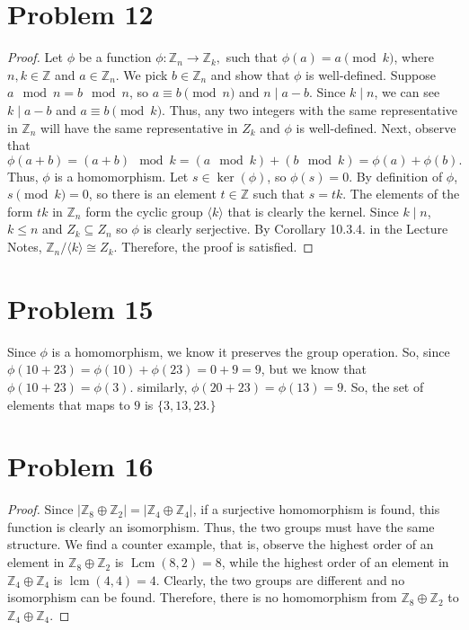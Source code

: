 \documentclass[a4paper,12pt]{article}
\begin{document}
\section*{Problem 12}
\begin{proof}
    Let $\phi$ be a function $\phi: \mathbb{Z}_n \to \mathbb{Z}_k,$ such that $\phi(a)=a \pmod k$, where $n,k \in \mathbb{Z}$ and $a \in \mathbb{Z}_n.$ We pick $b \in \mathbb{Z}_n$ and show that $\phi$ is well-defined. Suppose $a \mod n = b \mod n$, so $a \equiv b \pmod n$ and $n \mid a-b$. Since $k \mid n$, we can see $k \mid a-b$ and $a \equiv b \pmod k$. Thus, any two integers with the same representative in $\mathbb{Z}_n$ will have the same representative in $Z_k$ and $\phi$ is well-defined.
    Next, observe that
    \[\phi(a+b)=(a+b) \mod k=(a \mod k)+(b \mod k)=\phi(a)+\phi(b).\]
    Thus, $\phi$ is a homomorphism. Let $s \in \operatorname{ker}(\phi)$, so $\phi(s)=0$. By definition of $\phi$, $s \pmod k=0$, so there is an element $t \in \mathbb{Z}$ such that $s =tk$. The elements of the form $tk$ in $\mathbb{Z}_n$ form the cyclic group $\langle k \rangle$ that is clearly the kernel.
    Since $k \mid n$, $k\le n$ and $Z_k \subseteq Z_n$ so $\phi$ is clearly serjective. By Corollary 10.3.4. in the Lecture Notes, $\mathbb{Z}_n/\langle k\rangle \cong Z_k.$ Therefore, the proof is satisfied.
\end{proof}
\section*{Problem 15}
Since $\phi$ is a homomorphism, we know it preserves the group operation. So, since $\phi(10+23)=\phi(10)+\phi(23)=0+9=9$, but we know that $\phi(10+23)=\phi(3).$ similarly, $\phi(20+23)=\phi(13)=9$. So, the set of elements that maps to $9$ is $\{3,13,23.\}$
\section*{Problem 16}
\begin{proof}
    Since $|\mathbb{Z}_8\oplus \mathbb{Z}_2|=|\mathbb{Z}_4 \oplus \mathbb{Z}_4|$, if a surjective homomorphism is found, this function is clearly an isomorphism. Thus, the two groups must have the same structure. We find a counter example, that is, observe the highest order of an element in $\mathbb{Z}_8 \oplus \mathbb{Z}_2$ is $\operatorname{Lcm}(8,2)=8$, while the highest order of an element in $\mathbb{Z}_4 \oplus \mathbb{Z}_4$ is $\operatorname{lcm}(4,4)=4$. Clearly, the two groups are different and no isomorphism can be found. Therefore, there is no homomorphism from $\mathbb{Z}_8\oplus \mathbb{Z}_2$ to $\mathbb{Z}_4\oplus \mathbb{Z}_4.$ 
\end{proof}
\end{document}
